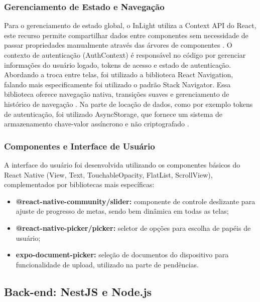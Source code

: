 \subsubsection{Gerenciamento de Estado e Navegação}
Para o gerenciamento de estado global, o InLight utiliza a Context API do React, este recurso permite compartilhar dados entre componentes sem necessidade de passar propriedades manualmente através das árvores de componentes \cite{react2023}. O contexto de autenticação (AuthContext) é responsável no código por gerenciar informações do usuário logado, tokens de acesso e estado de autenticação.
Abordando a troca entre telas, foi utilizado a biblioteca React Navigation, falando mais especificamente foi utilizado o padrão Stack Navigator. Essa biblioteca oferece navegação nativa, transições suaves e gerenciamento de histórico de navegação \cite{reactnavigation2023}.
Na parte de locação de dados, como por exemplo tokens de autenticação, foi utilizado AsyncStorage, que fornece um sistema de armazenamento chave-valor assíncrono e não criptografado \cite{reactnative2023}.
\subsubsection{Componentes e Interface de Usuário}
A interface do usuário foi desenvolvida utilizando os componentes básicos do React Native (View, Text, TouchableOpacity, FlatList, ScrollView), complementados por bibliotecas mais específicas:
\begin{itemize}
    \item \textbf{@react-native-community/slider:} componente de controle deslizante para ajuste de progresso de metas, sendo bem dinâmica em todas as telas;
    \item \textbf{@react-native-picker/picker:} seletor de opções para escolha de papéis de usuário;
    \item \textbf{expo-document-picker:} seleção de documentos do dispositivo para funcionalidade de upload, utilizado na parte de pendências.
\end{itemize}
\subsection{Back-end: NestJS e Node.js}

